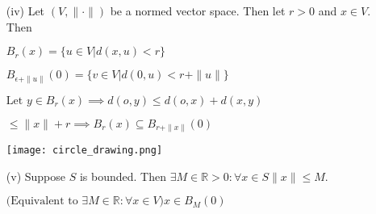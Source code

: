 \documentclass{article}
\theoremstyle{definition}
\numberwithin{equation}{section}
\begin{document}
\begin{itemize}
    \item[(iv)] Let \((V, \| \cdot \|)\) be a normed vector space. Then let \(r > 0\) and \(x \in V\). Then

    $
    B_r(x) = \{ u \in V | d(x,u) < r \}
    $

    $
    B_{\epsilon + \|u\|}(0) = \{ v \in V | d(0,u) < r + \| u \| \}
    $

    $
    \text{Let } y \in B_r(x) \implies d(o,y) \leq d(o,x) + d(x,y)
    $

    $
    \leq \| x \| + r \implies B_r(x) \subseteq B_{r + \| x \|}(0)
    $

    \begin{center}
        \texttt{[image: circle\_drawing.png]}
    \end{center}
\end{itemize}

\begin{itemize}
    \item[(v)] Suppose \(S\) is bounded. Then \(\exists M \in \mathbb{R} > 0: \forall x \in S \| x \| \leq M\).

    $
    \text{(Equivalent to } \exists M \in \mathbb{R}: \forall x \in V) x \in B_{M}(0)
    $
\end{itemize}
\end{document}
